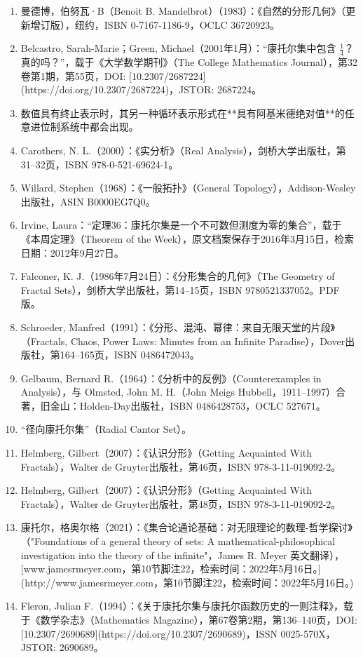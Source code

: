 \begin{enumerate}
\item 曼德博，伯努瓦·B（Benoit B. Mandelbrot）（1983）：《自然的分形几何》（更新增订版），纽约，ISBN 0-7167-1186-9，OCLC 36720923。
\item Belcastro, Sarah-Marie；Green, Michael（2001年1月）：“康托尔集中包含 $\frac{1}{4}$？真的吗？”，载于《大学数学期刊》（The College Mathematics Journal），第32卷第1期，第55页，DOI: [10.2307/2687224](https://doi.org/10.2307/2687224)，JSTOR: 2687224。
\item 数值具有终止表示时，其另一种循环表示形式在**具有阿基米德绝对值**的任意进位制系统中都会出现。
\item Carothers, N. L.（2000）：《实分析》（Real Analysis），剑桥大学出版社，第31–32页，ISBN 978-0-521-69624-1。
\item Willard, Stephen（1968）：《一般拓扑》（General Topology），Addison-Wesley 出版社，ASIN B0000EG7Q0。
\item Irvine, Laura：“定理36：康托尔集是一个不可数但测度为零的集合”，载于《本周定理》（Theorem of the Week），原文档案保存于2016年3月15日，检索日期：2012年9月27日。
\item Falconer, K. J.（1986年7月24日）：《分形集合的几何》（The Geometry of Fractal Sets），剑桥大学出版社，第14–15页，ISBN 9780521337052。PDF版。
\item Schroeder, Manfred（1991）：《分形、混沌、幂律：来自无限天堂的片段》（Fractals, Chaos, Power Laws: Minutes from an Infinite Paradise），Dover出版社，第164–165页，ISBN 0486472043。
\item Gelbaum, Bernard R.（1964）：《分析中的反例》（Counterexamples in Analysis），与 Olmsted, John M. H.（John Meigs Hubbell，1911–1997）合著，旧金山：Holden-Day出版社，ISBN 0486428753，OCLC 527671。
\item “径向康托尔集”（Radial Cantor Set）。
\item Helmberg, Gilbert（2007）：《认识分形》（Getting Acquainted With Fractals），Walter de Gruyter出版社，第46页，ISBN 978-3-11-019092-2。
\item Helmberg, Gilbert（2007）：《认识分形》（Getting Acquainted With Fractals），Walter de Gruyter出版社，第48页，ISBN 978-3-11-019092-2。
\item 康托尔，格奥尔格（2021）：《集合论通论基础：对无限理论的数理-哲学探讨》（"Foundations of a general theory of sets: A mathematical-philosophical investigation into the theory of the infinite"，James R. Meyer 英文翻译），[www.jamesrmeyer.com，第10节脚注22，检索时间：2022年5月16日。](http://www.jamesrmeyer.com，第10节脚注22，检索时间：2022年5月16日。)
\item Fleron, Julian F.（1994）：《关于康托尔集与康托尔函数历史的一则注释》，载于《数学杂志》（Mathematics Magazine），第67卷第2期，第136–140页，DOI: [10.2307/2690689](https://doi.org/10.2307/2690689)，ISSN 0025-570X，JSTOR: 2690689。
\end{enumerate}
